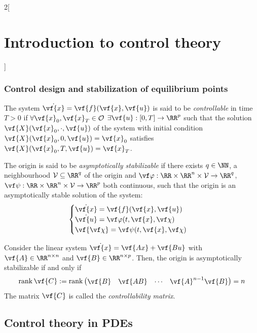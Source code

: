 \documentclass[../../../main_math.tex]{subfiles}
\begin{document}
\begin{multicols}{2}[\section{Introduction to control theory}]
  \subsubsection{Control design and stabilization of equilibrium points}
  \begin{definition}
    The system $\dot{\vf{x}} = \vf{f}(\vf{x}, \vf{u})$ is said to be \emph{controllable} in time $T>0$ if $\forall \vf{x}_0, \vf{x}_T\in \mathcal{O}$ $\exists \vf{u}: [0, T]\to \RR^p$ such that the solution $\vf{X}(\vf{x}_0,\cdot, \vf{u})$ of the system with initial condition $\vf{X}(\vf{x}_0, 0,\vf{u}) = \vf{x}_0$ satisfies $\vf{X}(\vf{x}_0, T,\vf{u}) = \vf{x}_T$.
  \end{definition}
  \begin{definition}
    The origin is said to be \emph{asymptotically stabilizable} if there exists $q\in \NN$, a neighbourhood $\mathcal{V}\subseteq \RR^q$ of the origin and $\vf\varphi:\RR\times\RR^n\times\mathcal{V}\to \RR^q$, $\vf\psi:\RR\times\RR^n\times\mathcal{V}\to \RR^p$ both continuous, such that the origin is an asymptotically stable solution of the system:
    $$
      \begin{cases}
        \dot{\vf{x}} = \vf{f}(\vf{x}, \vf{u})         \\
        \dot{\vf{u}} = \vf\varphi(t, \vf{x}, \vf\chi) \\
        \vf{\vf\chi} = \vf\psi(t, \vf{x}, \vf\chi)
      \end{cases}
    $$
  \end{definition}
  \begin{theorem}
    Consider the linear system $\dot{\vf{x}} = \vf{Ax} + \vf{Bu}$ with $\vf{A}\in \RR^{n\times n}$ and $\vf{B}\in \RR^{n\times p}$. Then, the origin is asymptotically stabilizable if and only if
    $$
      \rank\vf{C}:=\rank\begin{pmatrix} \vf{B} & \vf{AB} & \cdots & \vf{A}^{n-1}\vf{B} \end{pmatrix} = n
    $$
    The matrix $\vf{C}$ is called the \emph{controllability matrix}.
  \end{theorem}

  \subsection{Control theory in PDEs}
\end{multicols}
\end{document}
